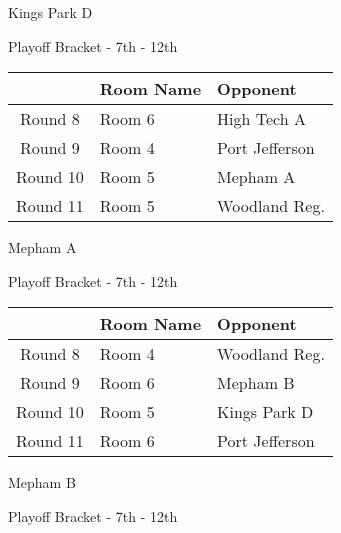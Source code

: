 \documentclass{article}%
\begin{document}
\vspace*{80pt}%
\linebreak%
\newpage%
\begin{center}%
\begin{Huge}%
Kings Park D%
\end{Huge}%
\vspace*{12pt}%
\linebreak%
\begin{Large}%
Playoff Bracket {-} 7th {-} 12th%
\end{Large}%
\end{center}%
\vspace*{4pt}%
%
\begin{tabularx}{\textwidth}{|c|Y|Y|}%
\hline%
&Room Name&Opponent\\%
\hline%
Round 8&Room 6&High Tech A\\%
Round 9&Room 4&Port Jefferson\\%
Round 10&Room 5&Mepham A\\%
Round 11&Room 5&Woodland Reg.\\%
\hline%
\end{tabularx}%
\vspace*{80pt}%
\linebreak%
\newpage%
\begin{center}%
\begin{Huge}%
Mepham A%
\end{Huge}%
\vspace*{12pt}%
\linebreak%
\begin{Large}%
Playoff Bracket {-} 7th {-} 12th%
\end{Large}%
\end{center}%
\vspace*{4pt}%
%
\begin{tabularx}{\textwidth}{|c|Y|Y|}%
\hline%
&Room Name&Opponent\\%
\hline%
Round 8&Room 4&Woodland Reg.\\%
Round 9&Room 6&Mepham B\\%
Round 10&Room 5&Kings Park D\\%
Round 11&Room 6&Port Jefferson\\%
\hline%
\end{tabularx}%
\vspace*{80pt}%
\linebreak%
\newpage%
\begin{center}%
\begin{Huge}%
Mepham B%
\end{Huge}%
\vspace*{12pt}%
\linebreak%
\begin{Large}%
Playoff Bracket {-} 7th {-} 12th%
\end{Large}%
\end{center}%
\end{document}
